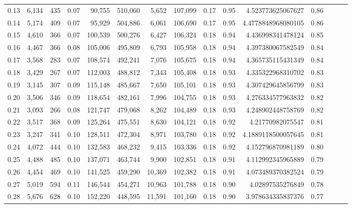 \begin{tabular}{rrrrrrrrrrrrrrr}
0.13 &   6,134 &    435 &  0.07 &   90,755 &  510,060 &    5,652 &  107,099 &  0.17 &  0.95 &     4.523773625067627 &      0.86 \\
0.14 &   5,174 &    409 &  0.07 &   95,929 &  504,886 &    6,061 &  106,690 &  0.17 &  0.95 &    4.4778848968080105 &      0.86 \\
0.15 &   4,610 &    366 &  0.07 &  100,539 &  500,276 &    6,427 &  106,324 &  0.18 &  0.94 &     4.436998341478124 &      0.85 \\
0.16 &   4,467 &    366 &  0.08 &  105,006 &  495,809 &    6,793 &  105,958 &  0.18 &  0.94 &     4.397380067582549 &      0.84 \\
0.17 &   3,568 &    283 &  0.07 &  108,574 &  492,241 &    7,076 &  105,675 &  0.18 &  0.94 &     4.365735115431349 &      0.84 \\
0.18 &   3,429 &    267 &  0.07 &  112,003 &  488,812 &    7,343 &  105,408 &  0.18 &  0.93 &     4.335322968310702 &      0.83 \\
0.19 &   3,145 &    307 &  0.09 &  115,148 &  485,667 &    7,650 &  105,101 &  0.18 &  0.93 &     4.307429645856799 &      0.83 \\
0.20 &   3,506 &    346 &  0.09 &  118,654 &  482,161 &    7,996 &  104,755 &  0.18 &  0.93 &     4.276334577963832 &      0.82 \\
0.21 &   3,093 &    266 &  0.08 &  121,747 &  479,068 &    8,262 &  104,489 &  0.18 &  0.93 &     4.248902448758769 &      0.82 \\
0.22 &   3,517 &    368 &  0.09 &  125,264 &  475,551 &    8,630 &  104,121 &  0.18 &  0.92 &      4.21770982075547 &      0.81 \\
0.23 &   3,247 &    341 &  0.10 &  128,511 &  472,304 &    8,971 &  103,780 &  0.18 &  0.92 &    4.1889118500057645 &      0.81 \\
0.24 &   4,072 &    444 &  0.10 &  132,583 &  468,232 &    9,415 &  103,336 &  0.18 &  0.92 &     4.152796870981189 &      0.80 \\
0.25 &   4,488 &    485 &  0.10 &  137,071 &  463,744 &    9,900 &  102,851 &  0.18 &  0.91 &     4.112992345965889 &      0.79 \\
0.26 &   4,454 &    469 &  0.10 &  141,525 &  459,290 &   10,369 &  102,382 &  0.18 &  0.91 &     4.073489370382524 &      0.79 \\
0.27 &   5,019 &    594 &  0.11 &  146,544 &  454,271 &   10,963 &  101,788 &  0.18 &  0.90 &      4.02897535276849 &      0.78 \\
0.28 &   5,676 &    628 &  0.10 &  152,220 &  448,595 &   11,591 &  101,160 &  0.18 &  0.90 &     3.978634335837376 &      0.77 \\

\end{tabular}
